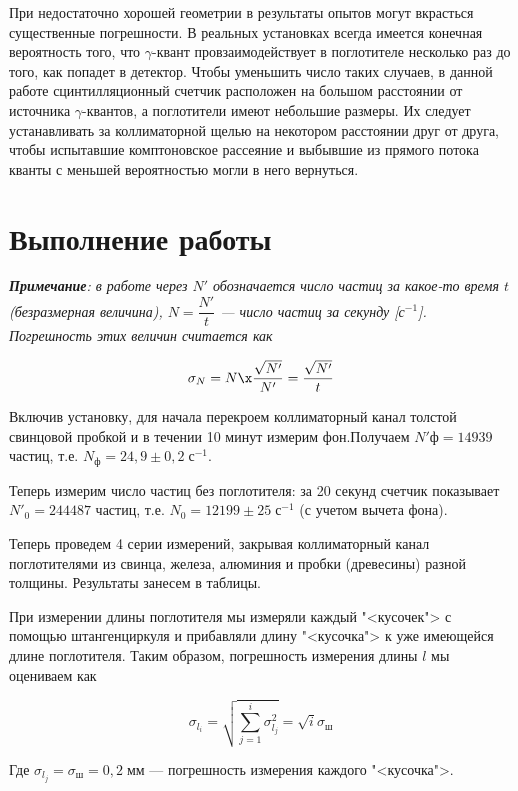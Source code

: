 \documentclass[12pt]{kiarticle}
\newcommand{\ga}{\ensuremath{\gamma}}
\begin{document}
При недостаточно хорошей геометрии в результаты опытов могут
вкрасться существенные погрешности. В реальных установках всегда имеется конечная вероятность того, что \ga-квант провзаимодействует в
поглотителе несколько раз до того, как попадет в детектор. Чтобы уменьшить число таких случаев, в данной работе сцинтилляционный счетчик расположен на большом расстоянии от источника \ga-квантов, а поглотители имеют небольшие
размеры. Их следует устанавливать за коллиматорной щелью на некотором расстоянии друг от друга, чтобы испытавшие комптоновское
рассеяние и выбывшие из прямого потока кванты с меньшей вероятностью могли в него вернуться.

\section{Выполнение работы}

 \textit{\textbf{Примечание}: в работе через $ N' $ обозначается число частиц за какое-то время $ t $ (безразмерная величина), $ N = \dfrac{N'}{t} $ --- число частиц за секунду [с$ ^{-1} $]. Погрешность этих величин считается как} 
 
 \begin{equation}\label{}
 \sigma_N = N \x \dfrac{\sqrt{N'}}{N'} = \dfrac{\sqrt{N'}}{t}
 \end{equation}

Включив установку, для начала перекроем коллиматорный канал толстой свинцовой пробкой и в течении 10 минут измерим фон.Получаем $ N'ф = 14939 $ частиц, т.е. $ N_ф = 24,9 \pm 0,2 \; с^{-1} $.

Теперь измерим число частиц без поглотителя: за 20 секунд счетчик показывает $ N'_0 = 244487 $ частиц, т.е. $ N_0 = 12199 \pm 25 \; с^{-1}$ (с учетом вычета фона). 

Теперь проведем 4 серии измерений, закрывая коллиматорный канал поглотителями из свинца, железа, алюминия и пробки (древесины) разной толщины. Результаты занесем в таблицы. 

При измерении длины поглотителя мы измеряли каждый "<кусочек"> с помощью штангенциркуля и прибавляли длину "<кусочка"> к уже имеющейся длине поглотителя. Таким образом,  погрешность измерения длины $ l $ мы оцениваем как

\begin{equation}\label{}
\sigma_{l_i} = \sqrt{\sum\limits_{j=1}^i \sigma_{l_j}^2} = \sqrt{i}\sigma_ш
\end{equation}

Где $ \sigma_{l_j} = \sigma_ш = 0,2 \;мм $ --- погрешность измерения каждого "<кусочка">. 
\end{document}
